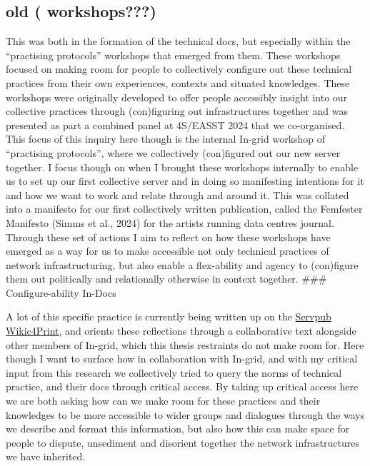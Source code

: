 \hypertarget{old-workshops}{%
\subsection[old (
workshops???)]{\texorpdfstring{\protect\hypertarget{anchor}{}{}old (
workshops???)}{old ( workshops???)}}\label{old-workshops}}

This was both in the formation of the technical docs, but especially
within the ``practising protocols'' workshops that emerged from them.
These workshops focused on making room for people to collectively
configure out these technical practices from their own experiences,
contexts and situated knowledges. These workshops were originally
developed to offer people accessibly insight into our collective
practices through (con)figuring out infrastructures together and was
presented as part a combined panel at 4S/EASST 2024 that we
co-organised. This focus of this inquiry here though is the internal
In-grid workshop of ``practising protocols'', where we collectively
(con)figured out our new server together. I focus though on when I
brought these workshops internally to enable us to set up our first
collective server and in doing so manifesting intentions for it and how
we want to work and relate through and around it. This was collated into
a manifesto for our first collectively written publication, called the
Femfester Manifesto (Simms et al., 2024) for the artists running data
centres journal. Through these set of actions I aim to reflect on how
these workshops have emerged as a way for us to make accessible not only
technical practices of network infrastructuring, but also enable a
flex-ability and agency to (con)figure them out politically and
relationally otherwise in context together. \#\#\# Configure-ability
In-Docs

A lot of this specific practice is currently being written up on the
\href{https://wiki4print.servpub.net/index.php?title=Chapter_3:_Praxis_Doubling}{Servpub
Wikic4Print}, and orients these reflections through a collaborative text
alongside other members of In-grid, which this thesis restraints do not
make room for. Here though I want to surface how in collaboration with
In-grid, and with my critical input from this research we collectively
tried to query the norms of technical practice, and their docs through
critical access. By taking up critical access here we are both asking
how can we make room for these practices and their knowledges to be more
accessible to wider groups and dialogues through the ways we describe
and format this information, but also how this can make space for people
to dispute, unsediment and disorient together the network
infrastructures we have inherited.

